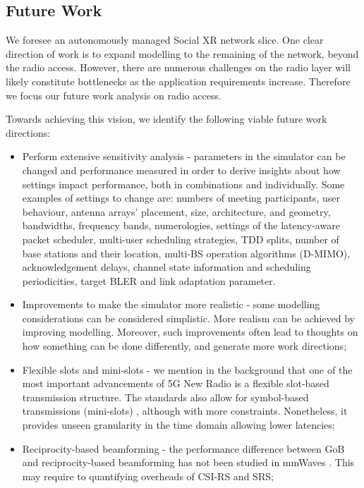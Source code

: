 \subsection*{Future Work}
\label{sec:future-work}

We foresee an autonomously managed Social XR network slice. One clear direction of work is to expand modelling to the remaining of the network, beyond the radio access. However, there are numerous challenges on the radio layer will likely constitute bottlenecks as the application requirements increase. Therefore we focus our future work analysis on radio access.

Towards achieving this vision, we identify the following viable future work directions:

\begin{itemize}
    \item Perform extensive sensitivity analysis - parameters in the simulator can be changed and performance measured in order to derive insights about how settings impact performance, both in combinations and individually. Some examples of settings to change are: numbers of meeting participants, user behaviour, antenna arrays' placement, size, architecture, and geometry, bandwidths, frequency bands, numerologies, settings of the latency-aware packet scheduler, multi-user scheduling strategies, TDD splits, number of base stations and their location, multi-BS operation algorithms (D-MIMO), acknowledgement delays, channel state information and scheduling periodicities, target \acs{BLER} and link adaptation parameter.
    \item Improvements to make the simulator more realistic - some modelling considerations can be considered simplistic. More realism can be achieved by improving modelling. Moreover, such improvements often lead to thoughts on how something can be done differently, and generate more work directions; 
    \item Flexible slots and mini-slots - we mention in the background that one of the most important advancements of 5G New Radio is a flexible slot-based transmission structure. The standards also allow for symbol-based transmissions (mini-slots) \cite{3GPP_minislots}, although with more constraints. Nonetheless, it provides unseen granularity in the time domain allowing lower latencies;
    \item Reciprocity-based beamforming - the performance difference between \ac{GoB} and reciprocity-based beamforming has not been studied in mmWaves \cite{tddVSfdd_massiveMIMO}. This may require to quantifying overheads of CSI-RS and SRS;

\end{itemize}
